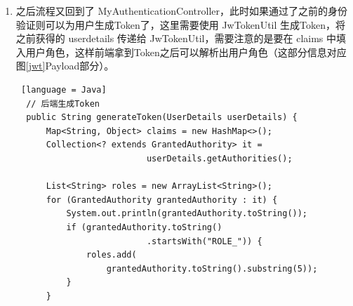\begin{enumerate}
\begin{enumerate}
\begin{lstlisting} [language = Java]
    // XXXDaoAuthProvider
    @Override
    public boolean supports(Class<?> authentication) {
        return XXXUsernamePasswordAutenticationToken
                .class
                .isAssignableFrom(authentication);
    }
              \end{lstlisting}
                    DaoAuthenticationProvider 是继承 AbstractUserDetailsAuthenticationProvider 的，不同在于 DaoAuthenticationProvider 增加了验证密码的功能，这也正是我们需要的，但是验证密码需要查询数据库也就需要 UserDetailService，所以需要通过 MySecurityConfig 为 XXXAuthProvider 注入不同的 XXXUserDetialsService。这里选择setter注入：
                    \begin{lstlisting} [language = Java]
  // XXXDaoAuthProvider
  @Override
  public void setUserDetailsService(
      UserDetailsService userDetailsService) {
      super.setUserDetailsService(userDetailsService);
  }
              \end{lstlisting}
                    \begin{lstlisting} [language = Java]
  // MySecurityConfig
  @Autowired
  @Qualifier("XXXUserDetailsService")
  private UserDetailsService XXXUserDetailsService;

  // 注入
  @Bean("XXXDaoAutenticationProvider")
  DaoAuthenticationProvider daoXXXDaoAutenticationProvider() 
  {
    return new XXXDaoAutenticationProvider(
                                passwordEncoder(), 
                                XXXUserDetailsService);
  }
              \end{lstlisting}
                    这个过程中涉及的类比较多且关系比较笔复杂，可以参考图\ref{SpringSecurityMultiUser}（经过简化，略去了与该流程相关程度不大的类）。
              \item 之后流程又回到了 MyAuthenticationController，此时如果通过了之前的身份验证则可以为用户生成Token了，这里需要使用 JwTokenUtil 生成Token，将 之前获得的 userdetails 传递给 JwTokenUtil，需要注意的是要在 claims 中填入用户角色，这样前端拿到Token之后可以解析出用户角色（这部分信息对应图\ref{jwt}Payload部分）。
                    \begin{lstlisting} [language = Java]
  // 后端生成Token
  public String generateToken(UserDetails userDetails) {
      Map<String, Object> claims = new HashMap<>();
      Collection<? extends GrantedAuthority> it = 
                          userDetails.getAuthorities();

      List<String> roles = new ArrayList<String>();
      for (GrantedAuthority grantedAuthority : it) {
          System.out.println(grantedAuthority.toString());
          if (grantedAuthority.toString()
                          .startsWith("ROLE_")) {
              roles.add(
                  grantedAuthority.toString().substring(5));
          }
      }
      

\end{lstlisting}
\end{enumerate}
\end{enumerate}
